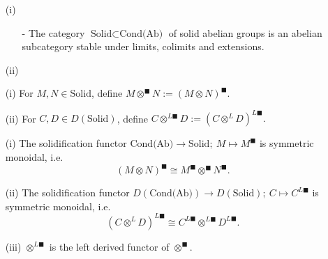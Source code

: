 \documentclass[UTF8,12,a4paper]{ctexart}
\theoremstyle{definition}
\begin{document}
\thm 

\begin{itemize}
	\item [(i)]
	\begin{itemize}
		\item [-]
		The category $\text{Solid}\subset\text{Cond(Ab)}$ of solid abelian groups is an abelian subcategory stable under limits, colimits and extensions.
	\end{itemize}
	\item [(ii)]
\end{itemize}





\dfn 
\begin{itemize}
	\item [(i)]For $M, N\in\text{Solid}$, define $M\otimes^\blacksquare N:=(M\otimes N)^\blacksquare.$
	\item [(ii)]For $C, D\in D(\text{Solid})$, define $C\otimes^{L\blacksquare} D:=(C\otimes^L D)^{L\blacksquare}.$
\end{itemize}

\thm 
\begin{itemize}
	\item [(i)] The solidification functor $\text{Cond(Ab)}\rightarrow \text{Solid};\ M\mapsto M^\blacksquare$ is symmetric monoidal, i.e.
	$$
	(M\otimes N)^\blacksquare\cong M^\blacksquare \otimes^\blacksquare N^\blacksquare.
	$$
	\item [(ii)]
	 The solidification functor $D(\text{Cond(Ab)})\rightarrow D(\text{Solid});\ C\mapsto C^{L\blacksquare}$ is symmetric monoidal, i.e.
	$$
	(C\otimes^L D)^{L\blacksquare}\cong C^{L\blacksquare} \otimes^{L\blacksquare} D^{L\blacksquare}.
	$$
	\item [(iii)]$\otimes^{L\blacksquare}$ is the left derived functor of $\otimes^{\blacksquare}$.
\end{itemize}
\end{document}
